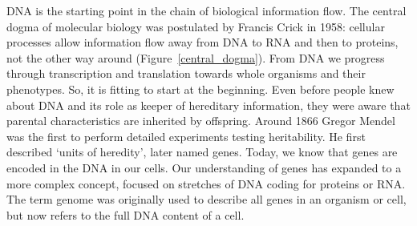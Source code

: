 DNA is the starting point in the chain of biological information flow. The
central dogma of molecular biology was postulated by Francis Crick in 1958:
cellular processes allow information flow away from DNA to RNA and then to
proteins, not the other way around (Figure~\ref{central_dogma}). From DNA we progress
through transcription and translation towards whole organisms and their
phenotypes. So, it is fitting to start at the beginning. Even before
people knew about DNA and its role as keeper of hereditary information, they
were aware that parental characteristics are inherited by offspring. Around
1866 Gregor Mendel was the first to perform detailed experiments testing
heritability. He first described `units of heredity', later named genes.
Today, we know that genes are encoded in the DNA in our cells. Our
understanding of genes has expanded to a more complex concept, focused on
stretches of DNA coding for proteins or RNA. The term genome was originally
used to describe all genes in an organism or cell, but now refers to the
full DNA content of a cell.


